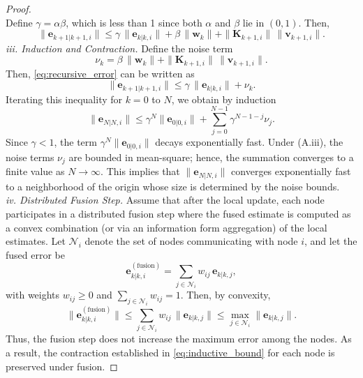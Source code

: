 \documentclass[letterpaper, 10 pt, conference]{ieeeconf}
\begin{document}
\begin{proof}
\begin{equation}
    \label{eq:combined_bound}
\end{equation}
Define $\gamma = \alpha\beta$, which is less than 1 since both $\alpha$ and $\beta$ lie in $(0,1)$. Then,
\begin{equation}
    \|\mathbf{e}_{k+1|k+1,i}\| \leq \gamma\,\|\mathbf{e}_{k|k,i}\| + \beta\,\|\mathbf{w}_k\| + \|\mathbf{K}_{k+1,i}\|\,\|\mathbf{v}_{k+1,i}\|.
    \label{eq:recursive_error}
\end{equation}
\noindent\textit{iii. Induction and Contraction.}  
Define the noise term
\begin{equation}
    \nu_k = \beta\,\|\mathbf{w}_k\| + \|\mathbf{K}_{k+1,i}\|\,\|\mathbf{v}_{k+1,i}\|.
\end{equation}
Then, \eqref{eq:recursive_error} can be written as
\begin{equation}
    \|\mathbf{e}_{k+1|k+1,i}\| \leq \gamma\,\|\mathbf{e}_{k|k,i}\| + \nu_k.
    \label{eq:error_recursion}
\end{equation}
Iterating this inequality for $k{=}0$ to $N$, we obtain by induction
\begin{equation}
    \|\mathbf{e}_{N|N,i}\| \leq \gamma^N \|\mathbf{e}_{0|0,i}\| + \sum_{j=0}^{N-1} \gamma^{N-1-j} \nu_j.
    \label{eq:inductive_bound}
\end{equation}
Since $\gamma < 1$, the term $\gamma^N \|\mathbf{e}_{0|0,i}\|$ decays exponentially fast. Under (A.iii), the noise terms $\nu_j$ are bounded in mean-square; hence, the summation converges to a finite value as $N \to \infty$. This implies that $\|\mathbf{e}_{N|N,i}\|$ converges exponentially fast to a neighborhood of the origin whose size is determined by the noise bounds. \\
\noindent\textit{iv. Distributed Fusion Step.}  
Assume that after the local update, each node participates in a distributed fusion step where the fused estimate is computed as a convex combination (or via an information form aggregation) of the local estimates. Let $\mathcal{N}_i$ denote the set of nodes communicating with node $i$, and let the fused error be
\begin{equation}
    \mathbf{e}^{(\mathrm{fusion})}_{k|k,i} = \sum_{j \in \mathcal{N}_i} w_{ij}\, \mathbf{e}_{k|k,j},
\end{equation}
with weights $w_{ij}{\geq} 0$ and $\sum_{j\in \mathcal{N}_i}w_{ij}{=}1$. Then, by convexity,
\begin{equation}
    \|\mathbf{e}^{(\mathrm{fusion})}_{k|k,i}\| \leq \sum_{j\in \mathcal{N}_i} w_{ij}\, \|\mathbf{e}_{k|k,j}\| \leq \max_{j\in \mathcal{N}_i}\|\mathbf{e}_{k|k,j}\|.
    \label{eq:fusion_bound}
\end{equation}
Thus, the fusion step does not increase the maximum error among the nodes. As a result, the contraction established in \eqref{eq:inductive_bound} for each node is preserved under fusion.


\end{proof}
\end{document}
